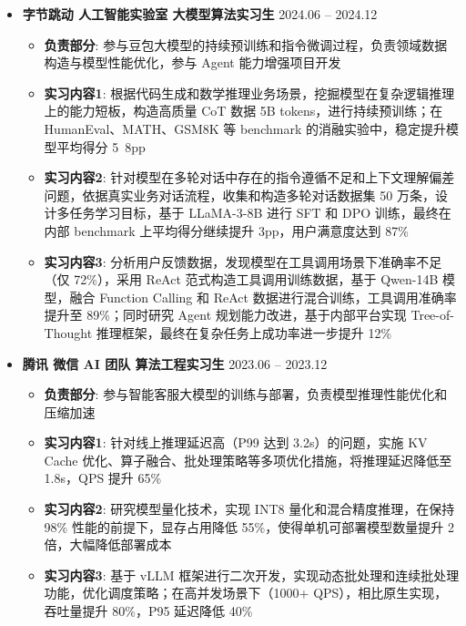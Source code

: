 \documentclass[zh]{resume}
\begin{document}
\begin{itemize}
    \item \textbf{字节跳动 \quad 人工智能实验室 \quad 大模型算法实习生} \hfill 2024.06 -- 2024.12
    \begin{itemize}
      \item \textbf{负责部分}: 参与豆包大模型的持续预训练和指令微调过程，负责领域数据构造与模型性能优化，参与 Agent 能力增强项目开发
      \item \textbf{实习内容1}: 根据代码生成和数学推理业务场景，挖掘模型在复杂逻辑推理上的能力短板，构造高质量 CoT 数据 5B tokens，进行持续预训练；在 HumanEval、MATH、GSM8K 等 benchmark 的消融实验中，稳定提升模型平均得分 5~8pp
      \item \textbf{实习内容2}: 针对模型在多轮对话中存在的指令遵循不足和上下文理解偏差问题，依据真实业务对话流程，收集和构造多轮对话数据集 50 万条，设计多任务学习目标，基于 LLaMA-3-8B 进行 SFT 和 DPO 训练，最终在内部 benchmark 上平均得分继续提升 3pp，用户满意度达到 87\%
      \item \textbf{实习内容3}: 分析用户反馈数据，发现模型在工具调用场景下准确率不足（仅 72\%），采用 ReAct 范式构造工具调用训练数据，基于 Qwen-14B 模型，融合 Function Calling 和 ReAct 数据进行混合训练，工具调用准确率提升至 89\%；同时研究 Agent 规划能力改进，基于内部平台实现 Tree-of-Thought 推理框架，最终在复杂任务上成功率进一步提升 12\%
    \end{itemize}

    \item \textbf{腾讯 \quad 微信 AI 团队 \quad 算法工程实习生} \hfill 2023.06 -- 2023.12
    \begin{itemize}
      \item \textbf{负责部分}: 参与智能客服大模型的训练与部署，负责模型推理性能优化和压缩加速
      \item \textbf{实习内容1}: 针对线上推理延迟高（P99 达到 3.2s）的问题，实施 KV Cache 优化、算子融合、批处理策略等多项优化措施，将推理延迟降低至 1.8s，QPS 提升 65\%
      \item \textbf{实习内容2}: 研究模型量化技术，实现 INT8 量化和混合精度推理，在保持 98\% 性能的前提下，显存占用降低 55\%，使得单机可部署模型数量提升 2 倍，大幅降低部署成本
      \item \textbf{实习内容3}: 基于 vLLM 框架进行二次开发，实现动态批处理和连续批处理功能，优化调度策略；在高并发场景下（1000+ QPS），相比原生实现，吞吐量提升 80\%，P95 延迟降低 40\%
    \end{itemize}
\end{itemize}
\end{document}
